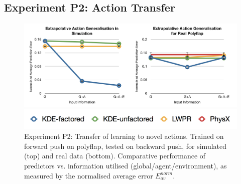 
\subsection{Experiment P2: Action Transfer}
\label{sec:Results.Action}

\begin{figure}[t]
\centerline{\includegraphics[width=0.9\columnwidth]{graphs_jw/A_real_sim_av_graph}}
\centerline{\includegraphics[width=0.9\columnwidth]{graphs_jw/graph_key}}
\caption{Experiment P2: Transfer of learning to novel actions.
Trained on forward push on polyflap, tested on backward push,
for simulated (top) and real data (bottom).
Comparative performance of predictors vs. information utilised
(global/agent/environment),
as measured by the normalised average error ${E_{av}^{norm}}$.
}\label{fig:A_av_graphs}
\end{figure}

